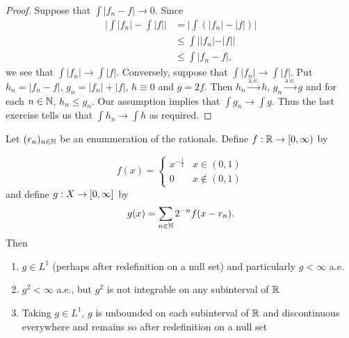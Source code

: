 \documentclass{book}
\begin{document}
	\begin{proof}
		Suppose that $\int |f_n - f| \rightarrow 0$. Since 
		\begin{align*}
			\bigg|\int |f_n| - \int |f|\bigg| 
			&= \bigg|\int (|f_n| - |f|)\bigg|\\
			&\leq \int ||f_n| - |f||\\
			&\leq \int |f_n - f|,
		\end{align*}
		we see that $\int |f_n| \rightarrow \int |f|$. Conversely, suppose that $\int |f_n| \rightarrow \int |f|$. Put $h_n = |f_n-f|$,  $g_n = |f_n| + |f|$, $h \equiv 0$ and $g = 2f$. Then $h_n \xrightarrow{\text{a.e.}} h$, $g_n \xrightarrow{\text{a.e.}} g$ and for each $n \in \mathbb{N}$, $h_n \leq g_n$. Our assumption implies that $\int g_n \rightarrow \int g$. Thus the last exercise tells us that $\int h_n \rightarrow \int h$ as required. 
		
	\end{proof}
	
	\begin{ex}  
		Let $(r_n)_{n \in \mathbb{N}}$ be an enummeration of the rationals. Define $f: \mathbb{R} \rightarrow [0,\infty)$ by 
		
		\[ f(x) = \begin{cases} 
			x^{-\frac{1}{2}} & x \in (0,1) \\
			0 & x \not\in (0,1)
		\end{cases}
		\]
		and define $g: X \rightarrow [0,\infty]$ by 
		$$g(x) = \sum\limits_{n \in \mathbb{N}}2^{-n}f(x -r_n).$$
		Then 
		\begin{enumerate}
			\item $g \in L^1$ (perhaps after redefinition on a null set) and particularly $g < \infty$ a.e. 
			\item $g^2 < \infty$ a.e., but $g^2$ is not integrable on any subinterval of $\mathbb{R}$
			\item Taking $g \in L^1$, $g$ is unbounded on each subinterval of $\mathbb{R}$ and discontinuous everywhere and remains so after redefinition on a null set
		\end{enumerate}
	\end{ex}
	
\end{document}
